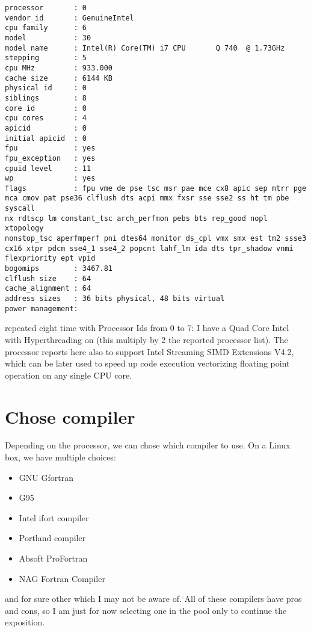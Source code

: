 \begin{Verbatim}
processor       : 0
vendor_id       : GenuineIntel
cpu family      : 6
model           : 30
model name      : Intel(R) Core(TM) i7 CPU       Q 740  @ 1.73GHz
stepping        : 5
cpu MHz         : 933.000
cache size      : 6144 KB
physical id     : 0
siblings        : 8
core id         : 0
cpu cores       : 4
apicid          : 0
initial apicid  : 0
fpu             : yes
fpu_exception   : yes
cpuid level     : 11
wp              : yes
flags           : fpu vme de pse tsc msr pae mce cx8 apic sep mtrr pge
mca cmov pat pse36 clflush dts acpi mmx fxsr sse sse2 ss ht tm pbe syscall
nx rdtscp lm constant_tsc arch_perfmon pebs bts rep_good nopl xtopology
nonstop_tsc aperfmperf pni dtes64 monitor ds_cpl vmx smx est tm2 ssse3
cx16 xtpr pdcm sse4_1 sse4_2 popcnt lahf_lm ida dts tpr_shadow vnmi
flexpriority ept vpid
bogomips        : 3467.81                                                       
clflush size    : 64                                                            
cache_alignment : 64                                                            
address sizes   : 36 bits physical, 48 bits virtual                             
power management:
\end{Verbatim}

repeated eight time with Processor Ids from 0 to 7: I have a Quad Core Intel
with Hyperthreading on (this multiply by 2 the reported processor list).
The processor reports here also to support Intel Streaming SIMD Extensions V4.2,
which can be later used to speed up code execution vectorizing floating point
operation on any single CPU core.

\section{Chose compiler}

Depending on the processor, we can chose which compiler to use. On a Linux box,
we have multiple choices:

\begin{itemize}
\item GNU Gfortran
\item G95
\item Intel ifort compiler
\item Portland compiler
\item Absoft ProFortran
\item NAG Fortran Compiler
\end{itemize}

and for sure other which I may not be aware of. All of these compilers have pros
and cons, so I am just for now selecting one in the pool only to continue the
exposition.

